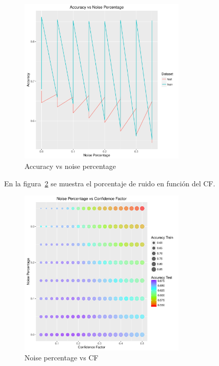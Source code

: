 \begin{figure}
  \centering
  \includegraphics[width = 8cm]{5c.pdf}
  \caption{Accuracy vs noise percentage}
  \label{fig:5c}
\end{figure}

En la figura~\ref{fig:5d} se muestra el porcentaje de ruido en función del CF.

\begin{figure}
  \centering
  \includegraphics[width = 8cm]{5d.pdf}
  \caption{Noise percentage vs CF}
  \label{fig:5d}
\end{figure}

